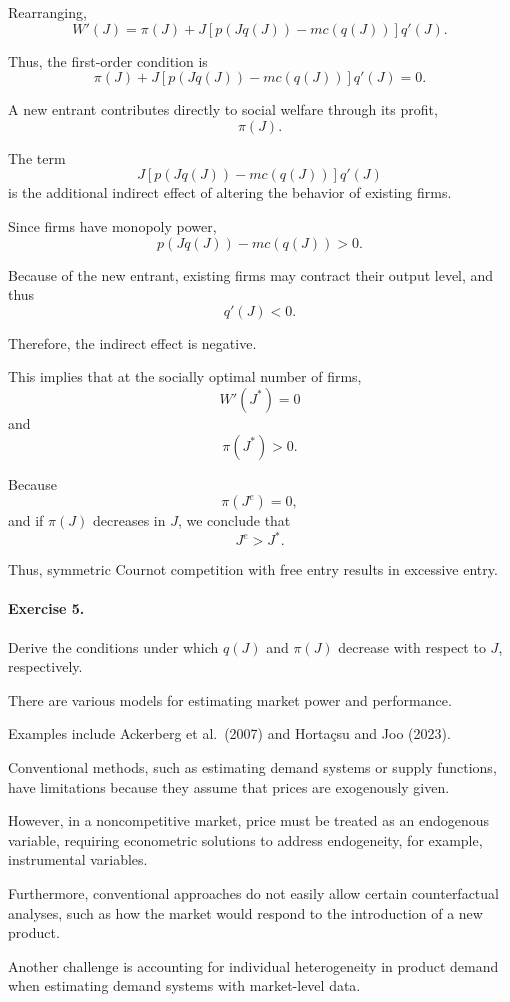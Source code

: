 Rearranging,
\[
W'(J)
=
\pi(J)
+
J
\left[
p(Jq(J))-mc(q(J))
\right]
q'(J).
\]

Thus, the first-order condition is
\[
\pi(J)
+
J
\left[
p(Jq(J))-mc(q(J))
\right]
q'(J)
=
0.
\]

A new entrant contributes directly to social welfare through its profit,
\[
\pi(J).
\]

The term
\[
J
\left[
p(Jq(J))-mc(q(J))
\right]
q'(J)
\]
is the additional indirect effect of altering the behavior of existing firms.

Since firms have monopoly power,
\[
p(Jq(J))-mc(q(J))>0.
\]

Because of the new entrant, existing firms may contract their output level, and thus
\[
q'(J)<0.
\]

Therefore, the indirect effect is negative.

This implies that at the socially optimal number of firms,
\[
W'(J^*)=0
\]
and
\[
\pi(J^*)>0.
\]

Because
\[
\pi(J^e)=0,
\]
and if \(\pi(J)\) decreases in \(J\), we conclude that
\[
J^e>J^*.
\]

Thus, symmetric Cournot competition with free entry results in excessive entry.

\paragraph{Exercise 5.}
Derive the conditions under which \(q(J)\) and \(\pi(J)\) decrease with respect to \(J\), respectively.

There are various models for estimating market power and performance.

Examples include Ackerberg et al.\ (2007) and Hortaçsu and Joo (2023).

Conventional methods, such as estimating demand systems or supply functions, have limitations because they assume that prices are exogenously given.

However, in a noncompetitive market, price must be treated as an endogenous variable, requiring econometric solutions to address endogeneity, for example, instrumental variables.

Furthermore, conventional approaches do not easily allow certain counterfactual analyses, such as how the market would respond to the introduction of a new product.

Another challenge is accounting for individual heterogeneity in product demand when estimating demand systems with market-level data.








